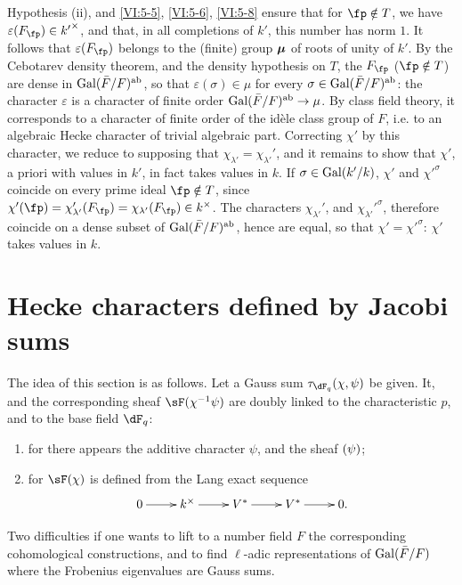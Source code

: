 Hypothesis (ii), and \ref{VI:5-5}, \ref{VI:5-6}, \ref{VI:5-8} ensure that
for $\fp\notin T$, we have $\varepsilon(F_\fp)\in {k'}^\times$, and that, in all
completions of $k'$, this number has norm $1$. It follows that
$\varepsilon(F_\fp)$ belongs to the (finite) group ${\bm\mu}$ of roots of unity
of $k'$. By the Cebotarev density theorem, and the density
hypothesis on $T$, the $F_\fp$ ($\fp\notin T$) are dense in
$\operatorname{Gal}(\bar F/F)^\text{ab}$, so that $\varepsilon(\sigma)\in \mu$ for every
$\sigma\in \operatorname{Gal}(\bar F/F)^\text{ab}$: the character $\varepsilon$ is a
character of finite order $\operatorname{Gal}(\bar F/F)^\text{ab}\to \mu$. By
class field theory, it corresponds to a character of finite order
of the idèle class group of $F$, i.e. to an algebraic Hecke
character of trivial algebraic part. Correcting $\chi'$ by this
character, we reduce to supposing that
$\chi_{\lambda'}=\chi_{\lambda'}'$, and it remains to show that $\chi'$, a
priori with values in $k'$, in fact takes values in $k$. If
$\sigma\in \operatorname{Gal}(k'/k)$, $\chi'$ and ${\chi'}^\sigma$ coincide on every prime
ideal $\fp\notin T$, since
$\chi'(\fp) = \chi'_{\lambda'}(F_\fp) = \chi_{\lambda'}(F_\fp) \in k^\times$.
The characters $\chi_{\lambda'}'$, and ${\chi_{\lambda'}'}^\sigma$, therefore
coincide on a dense subset of $\operatorname{Gal}(\bar F/F)^\text{ab}$, hence are equal, so
that $\chi'={\chi'}^\sigma$: $\chi'$ takes values in $k$. 










\section{Hecke characters defined by Jacobi sums}\label{VI:6}

The idea of this section is as follows. Let a Gauss sum
$\tau_{\dF_q}(\chi,\psi)$ be given. It, and the corresponding sheaf
$\sF(\chi^{-1}\psi)$ are doubly linked to the characteristic $p$, and to the
base field $\dF_q$:
\begin{enumerate}[\indent a)]
  \item for there appears the additive character $\psi$, and the sheaf
    $\sf(\psi)$;
  \item for $\sF(\chi)$ is defined from the Lang exact sequence 
    \[\xymatrix{
      0 \ar[r] 
        & k^\times \ar[r] 
        & V^\ast \ar[r] 
        & V^\ast \ar[r] 
        & 0 \text{.} 
    }\]
\end{enumerate}
Two difficulties if one wants to lift to a number field $F$ the
corresponding cohomological constructions, and to find
$\ell$-adic representations of $\operatorname{Gal}(\bar F/F)$ where the Frobenius
eigenvalues are Gauss sums.

